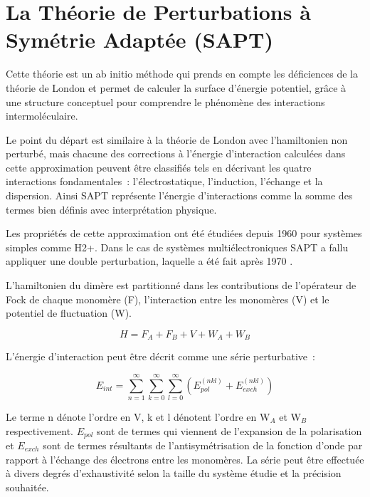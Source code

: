 \singlespacing
\section{La Théorie de Perturbations à Symétrie Adaptée (SAPT)}


Cette théorie est un ab initio méthode qui prends en compte les déficiences de la théorie de London et permet de calculer la surface d’énergie potentiel, grâce à une structure conceptuel pour comprendre le phénomène des interactions intermoléculaire. 

Le point du départ est similaire à la théorie de London avec l’hamiltonien non perturbé, mais chacune des corrections à l’énergie d’interaction calculées dans cette approximation peuvent être classifiés tels en décrivant les quatre interactions fondamentales : l’électrostatique,  l’induction, l’échange et la dispersion. Ainsi SAPT représente l’énergie d’interactions comme la somme des termes bien définis avec interprétation physique. 

Les propriétés de cette approximation ont été étudiées depuis 1960 pour systèmes simples comme H2+. Dans le cas de systèmes multiélectroniques SAPT a fallu appliquer une double perturbation, laquelle a été fait après 1970 \cite{szalewicz1979symmetry}. 

L’hamiltonien du dimère est partitionné dans les contributions de l’opérateur de Fock de chaque monomère (F), l’interaction entre les monomères (V) et le potentiel de fluctuation (W).

\begin{equation}
H = F_{A} + F_{B} + V + W_{A} + W_{B}
\end{equation}

L’énergie d’interaction peut être décrit comme une série perturbative :

\begin{equation}
E_{int} = \sum_{n=1}^{\infty} \sum_{k=0}^{\infty} \sum_{l=0}^{\infty} (E_{pol}^{(nkl)}+ E_{exch}^{(nkl)}) 
\end{equation}

Le terme n dénote l’ordre en V, k et l dénotent l’ordre en W$_{A}$ et W$_{B}$ respectivement. $E_{pol}$ sont de termes qui viennent de l’expansion de la polarisation et $E_{exch}$ sont de termes résultants de l’antisymétrisation de la fonction d’onde par rapport à l’échange des électrons entre les monomères.  
La série peut être effectuée à divers degrés d’exhaustivité selon la taille du système étudie et la précision souhaitée.  

